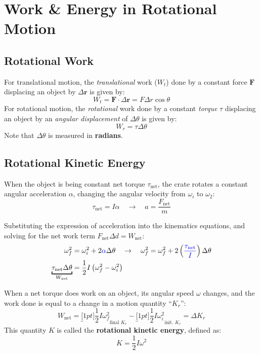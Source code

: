 \section{Work \& Energy in Rotational Motion}

\subsection{Rotational Work}
For translational motion, the \emph{translational} work ($W_t$) done by a
constant force $\bm F$ displacing an object by $\Delta\bm r$ is given by:
\begin{equation*}
  W_t = \bm F\cdot \Delta\bm r = F\Delta r\cos\theta
\end{equation*}
For rotational motion, the \emph{rotational} work done by a constant
\emph{torque} $\tau$ displacing an object by an \emph{angular displacement}
of $\Delta\theta$ is given by:
\begin{equation}
  \boxed{
    W_r = \tau\Delta\theta
  }
\end{equation}
Note that $\Delta\theta$ is measured in \textbf{radians}.



\subsection{Rotational Kinetic Energy}

When the object is being constant net torque $\tau_\text{net}$, the crate 
rotates a constant angular acceleration $\alpha$, changing the angular velocity
from $\omega_i$ to $\omega_2$:
\begin{equation}
  \tau_\text{net}=I\alpha\quad\rightarrow\quad a=\frac{F_\text{net}}m
\end{equation}

Substituting the expression of acceleration into the kinematics equations,
and solving for the net work term $F_\text{net}\Delta d=W_\text{net}$:
\begin{align*}
  \omega_f^2 &=\omega_i^2+2{\color{blue}\alpha}\Delta\theta
  \quad\rightarrow\quad
  \omega_f^2 =\omega_f^2+2\left({\color{blue}\frac{\tau_\text{net}}I}\right)
  \Delta\theta\\
  \underbracket[1pt]{\tau_\text{net}\Delta\theta}_{W_\text{net}}
  &=\frac12I\left(\omega_f^2-\omega_i^2\right)
\end{align*}

When a net torque does work on an object, its angular speed $\omega$ changes,
and the work done is equal to a change in a motion quantity ``$K_r$'':
\begin{equation}
  W_\text{net} =
  \underbracket[1pt]{\frac12I\omega_f^2}_{\text{final }K_r} -
  \underbracket[1pt]{\frac12I\omega_i^2}_{\text{init. }K_r} = \Delta K_r
\end{equation}
This quantity $K$ is called the \textbf{rotational kinetic energy}, defined as:
\begin{equation}
  \boxed{
    K=\frac12I\omega^2
  }
\end{equation}

